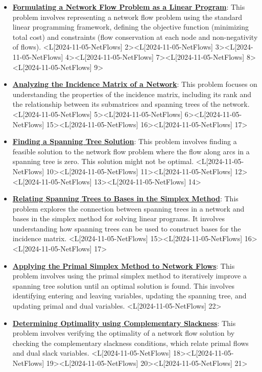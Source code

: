 \documentclass{article}%
\begin{document}
\begin{itemize}[[leftmargin=*]]%
\item \href{https://www.math.purdue.edu/~yipn/421/2024-11-05-NetFlows.pdf#page=2}{\textbf{Formulating a Network Flow Problem as a Linear Program}}: This problem involves representing a network flow problem using the standard linear programming framework, defining the objective function (minimizing total cost) and constraints (flow conservation at each node and non-negativity of flows). <L[2024-11-05-NetFlows] 2><L[2024-11-05-NetFlows] 3><L[2024-11-05-NetFlows] 4><L[2024-11-05-NetFlows] 7><L[2024-11-05-NetFlows] 8><L[2024-11-05-NetFlows] 9>%
\item \href{https://www.math.purdue.edu/~yipn/421/2024-11-05-NetFlows.pdf#page=5}{\textbf{Analyzing the Incidence Matrix of a Network}}: This problem focuses on understanding the properties of the incidence matrix, including its rank and the relationship between its submatrices and spanning trees of the network. <L[2024-11-05-NetFlows] 5><L[2024-11-05-NetFlows] 6><L[2024-11-05-NetFlows] 15><L[2024-11-05-NetFlows] 16><L[2024-11-05-NetFlows] 17>%
\item \href{https://www.math.purdue.edu/~yipn/421/2024-11-05-NetFlows.pdf#page=10}{\textbf{Finding a Spanning Tree Solution}}: This problem involves finding a feasible solution to the network flow problem where the flow along arcs in a spanning tree is zero. This solution might not be optimal. <L[2024-11-05-NetFlows] 10><L[2024-11-05-NetFlows] 11><L[2024-11-05-NetFlows] 12><L[2024-11-05-NetFlows] 13><L[2024-11-05-NetFlows] 14>%
\item \href{https://www.math.purdue.edu/~yipn/421/2024-11-05-NetFlows.pdf#page=15}{\textbf{Relating Spanning Trees to Bases in the Simplex Method}}: This problem explores the connection between spanning trees in a network and bases in the simplex method for solving linear programs. It involves understanding how spanning trees can be used to construct bases for the incidence matrix. <L[2024-11-05-NetFlows] 15><L[2024-11-05-NetFlows] 16><L[2024-11-05-NetFlows] 17>%
\item \href{https://www.math.purdue.edu/~yipn/421/2024-11-05-NetFlows.pdf#page=22}{\textbf{Applying the Primal Simplex Method to Network Flows}}: This problem involves using the primal simplex method to iteratively improve a spanning tree solution until an optimal solution is found. This involves identifying entering and leaving variables, updating the spanning tree, and updating primal and dual variables. <L[2024-11-05-NetFlows] 22>%
\item \href{https://www.math.purdue.edu/~yipn/421/2024-11-05-NetFlows.pdf#page=18}{\textbf{Determining Optimality using Complementary Slackness}}: This problem involves verifying the optimality of a network flow solution by checking the complementary slackness conditions, which relate primal flows and dual slack variables. <L[2024-11-05-NetFlows] 18><L[2024-11-05-NetFlows] 19><L[2024-11-05-NetFlows] 20><L[2024-11-05-NetFlows] 21>%
\end{itemize}%
\end{document}

